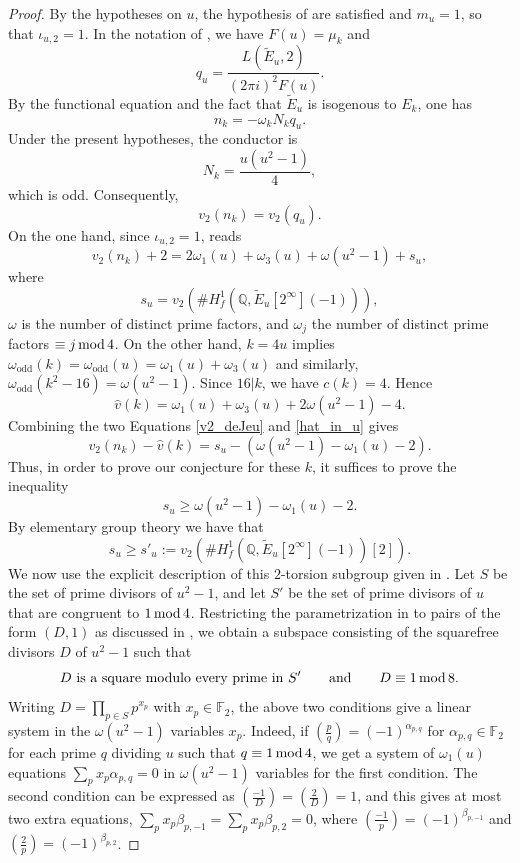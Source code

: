 \documentclass[12pt]{amsart}%
\renewcommand{\pmod}[1]{\hspace{0.05em}(\mathrm{mod}\,#1)}
\newcommand{\1}{\mathds{1}}
\renewcommand{\pmod}[1]{\,{\rm mod}\,#1}
\newcommand{\F}{\mathbb{F}}
\newcommand{\Q}{\mathbb{Q}}
\theoremstyle{definition}
\numberwithin{equation}{section}
\numberwithin{table}{section}
\numberwithin{figure}{section}
\begin{document}
\begin{proof}
By the hypotheses on $u$, the hypothesis of \cite[Theorem 1]{DGJK} are satisfied and $m_u = 1$, so that $\iota_{u,2} = 1$. In the notation of \cite{DGJK}, we have $F(u)=\mu_k$ and
\[
q_u=\frac{L(\widetilde E_u,2)}{(2\pi i)^2F(u)}.
\]
By the functional equation and the fact that $\widetilde E_u$ is
isogenous to $E_k$, one has
\[
n_k=-\omega_kN_kq_u.
\]
Under the present hypotheses, the conductor is
\[
N_k=\frac{u(u^2-1)}{4},
\]
which is odd.  Consequently,
\[
v_2(n_k)=v_2(q_u).
\]
    On the one hand, since $\iota_{u,2} = 1$, \cite[Equation (1.3)]{DGJK} reads
    \begin{equation}
    \label{v2_deJeu}
             v_2(n_k) + 2 = 2 \omega_1(u) + \omega_3(u) + \omega(u^2 -1) + s_u,
    \end{equation}
    where
    \[
    s_u = v_2 \left( \#H_f^{1}(\Q, \tilde{E}_{u}[2^\infty](-1))\right),
    \]
     $\omega$ is the number of distinct prime factors, and $\omega_j$ the number of distinct prime factors $\equiv j \pmod 4$. On the other hand, $k = 4u$ implies $\omega_{\text{odd}}(k) = \omega_{\text{odd}}(u) = \omega_1(u) + \omega_3(u)$ and similarly, $\omega_{\text{odd}}(k^2 - 16) = \omega(u^2-1)$. Since  $16 | k$, we have $c(k) = 4$.
Hence
\begin{equation}
\label{hat_in_u}
\hat{v}(k) = \omega_1(u) + \omega_3(u) + 2 \omega(u^2 - 1) - 4 .
\end{equation}
Combining the two Equations \eqref{v2_deJeu} and \eqref{hat_in_u} gives
\[
v_2(n_k) - \hat{v}(k) = s_u - (\omega(u^2 - 1)-\omega_1(u)- 2).
\]
Thus, in order to prove our conjecture for these $k$, it suffices to prove the inequality
\[
s_u \geq \omega(u^2 - 1)-\omega_1(u)- 2.
\]
By elementary group theory we have that
\[
s_u \geq s'_u :=v_2(\#H_f^{1}(\Q, \tilde{E}_{u}[2^\infty](-1))[2]).
\]
We now use the explicit description of this $2$-torsion subgroup given in \cite[Theorem 2]{DGJK}. Let $S$ be the set of prime divisors of $u^2-1$, and let $S'$ be the set of prime divisors of $u$ that are congruent to $1 \pmod 4$. Restricting the parametrization in \cite[Theorem~2]{DGJK} to pairs of the form $(D,1)$ as discussed in \cite[Remark~7.9]{DGJK}, we obtain a subspace consisting of the squarefree divisors $D$ of $u^2-1$ such that
\[
D \text{ is a square modulo every prime in } S'
\qquad\text{and}\qquad
D\equiv 1\pmod 8.
\]
Writing $D=\prod_{p\in S}p^{x_p}$ with $x_p\in \F_2$, the above two conditions give a linear system in the $\omega(u^2 - 1)$ variables $x_p$. Indeed, if $\left( \frac{p}{q} \right) = (-1)^{\alpha_{p, q}}$ for $\alpha_{p, q} \in \mathbb{F}_2$ for each prime $q$ dividing $u$ such that $q \equiv 1 \pmod 4$, we get a system of $\omega_1(u)$ equations $\sum_{p} x_p \alpha_{p,q} = 0$ in $\omega(u^2 - 1)$ variables for the first condition.  The second condition can be expressed as $\left(\frac{-1}{D}\right)=\left(\frac{2}{D}\right)=1$, and this gives at most two extra equations, $\sum_p x_p\beta_{p,-1}=\sum_p x_p\beta_{p,2}=0$, where $\left(\frac{-1}{p}\right)=(-1)^{\beta_{p,-1}}$ and  $\left(\frac{2}{p}\right)=(-1)^{\beta_{p,2}}$.

\end{proof}
\end{document}
